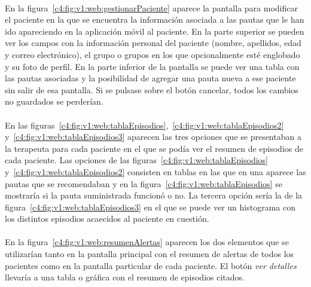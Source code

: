 \paragraph{}
En la figura~\ref{c4:fig:v1:web:gestionarPaciente} aparece la pantalla para modificar el paciente en la que se encuentra la información asociada a las pautas que le han ido apareciendo en la aplicación móvil al paciente. En la parte superior se pueden ver los campos con la información personal del paciente (nombre, apellidos, edad y correo electrónico), el grupo o grupos en los que opcionalmente esté englobado y su foto de perfil. En la parte inferior de la pantalla se puede ver una tabla con las pautas asociadas y la posibilidad de agregar una pauta nueva a ese paciente sin salir de esa pantalla. Si se pulsase sobre el botón cancelar, todos los cambios no guardados se perderían.

\paragraph{}
En las figuras~\ref{c4:fig:v1:web:tablaEpisodios},~\ref{c4:fig:v1:web:tablaEpisodios2} y~\ref{c4:fig:v1:web:tablaEpisodios3} aparecen las tres opciones que se presentaban a la terapeuta para cada paciente en el que se podía ver el resumen de episodios de cada paciente. Las opciones de las figuras~\ref{c4:fig:v1:web:tablaEpisodios} y~\ref{c4:fig:v1:web:tablaEpisodios2} consisten en tablas en las que en una aparece las pautas que se recomendaban y en la figura~\ref{c4:fig:v1:web:tablaEpisodios} se mostraría si la pauta suministrada funcionó o no. La tercera opción sería la de la figura~\ref{c4:fig:v1:web:tablaEpisodios3} en el que se puede ver un histograma con los distintos episodios acaecidos al paciente en cuestión.

\paragraph{}
En la figura~\ref{c4:fig:v1:web:resumenAlertas} aparecen los dos elementos que se utilizarían tanto en la pantalla principal con el resumen de alertas de todos los pacientes como en la pantalla particular de cada paciente. El botón \textit{ver detalles} llevaría a una tabla o gráfica con el resumen de episodios citados.

